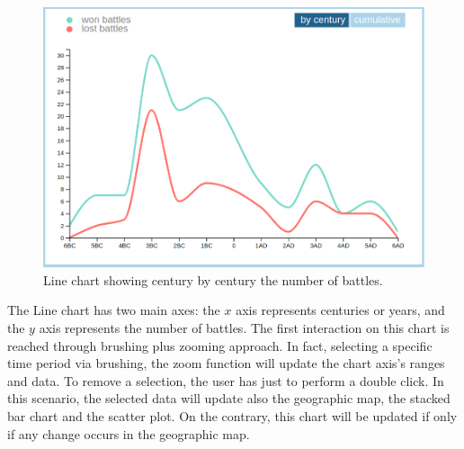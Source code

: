\begin{figure}[h]
    \centering
    \includegraphics[scale=0.20]{./images/line_chart.png}
    \caption{Line chart showing century by century the number of battles.}
\end{figure}

The Line chart has two main axes: the $x$ axis represents centuries or years, and the $y$ axis represents the number of battles. The first interaction on this chart is reached through brushing plus zooming approach. In fact, selecting a specific time period via brushing, the zoom function will update the chart axis's ranges and data. To remove a selection, the user has just to perform a double click. In this scenario, the selected data will update also the geographic map, the stacked bar chart and the scatter plot. On the contrary, this chart will be updated if only if any change occurs in the geographic map.

